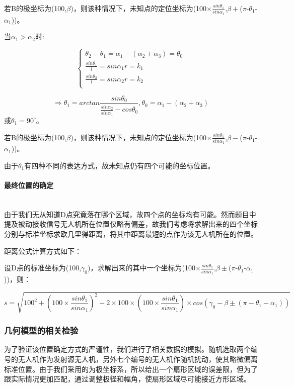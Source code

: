 \documentclass{ctexart}
\newcommand{\subsubsubsection}[1]{\paragraph{#1}\mbox{}\\}
\begin{document}
若B的极坐标为(100,$\beta$)，则该种情况下，未知点的定位坐标为(100$\times\frac{sin\theta_1}{sin\alpha_1}$,$\beta +$($\pi$-$\theta_1$-$\alpha_1$))。


当$\alpha_1 > \alpha_2$时:

\begin{equation}
    \left\{
              \begin{array}{ll}
                \theta_2-\theta_1=\alpha_1-(\alpha_2+\alpha_3)=\theta_0\\
                \frac{sin\theta_1}{l}={sin\alpha_1}{r}=k_1\\
                \frac{sin\theta_2}{l}={sin\alpha_2}{r}=k_2\\

              \end{array}
            \right.
\end{equation}

\[
    \Rightarrow \theta_1=arctan\frac{sin\theta_0}{\frac{sin\alpha_2}{sin\alpha_1}-cos\theta_0},\theta_0=\alpha_1-(\alpha_2+\alpha_3)
\]
或$\theta_1=90^{\circ}$。

若B的极坐标为(100,$\beta$)，则该种情况下，未知点的定位坐标为(100$\times\frac{sin\theta_1}{sin\alpha_1}$,$\beta -$($\pi$-$\theta_1$-$\alpha_1$))。

由于$\theta_1$有四种不同的表达方式，故未知点仍有四个可能的坐标位置。 

\subsubsubsection{最终位置的确定}

由于我们无从知道D点究竟落在哪个区域，故四个点的坐标均有可能。然而题目中提及被动接收信号无人机所在位置仅略有偏差，故我们考虑将求解出来的四个坐标分别与标准坐标求欧几里得距离，将其中距离最短的点作为该无人机所在的位置。

距离公式计算方式如下：

设D点的标准坐标为(100,$\gamma_0$)，求解出来的其中一个坐标为(100$\times\frac{sin\theta_1}{sin\alpha_1}$,$\beta \pm$($\pi$-$\theta_1$-$\alpha_1$))，则：

\[
 s=\sqrt{100^2+(100\times\frac{sin\theta_1}{sin\alpha_1})^2-2\times100\times(100\times\frac{sin\theta_1}{sin\alpha_1})\times cos(\gamma_0-\beta \pm(\pi-\theta_1-\alpha_1))}
\]

\subsubsection{几何模型的相关检验}

为了验证该位置确定方式的严谨性，我们进行了相关数据的模拟。随机选取两个编号的无人机作为发射源无人机，另外七个编号的无人机作随机扰动，使其略微偏离标准位置。由于我们采用的为极坐标系，所以给出一个扇形区域的误差限，但为了跟实际情况更加匹配，通过调整极径和幅角，使扇形区域尽可能接近方形区域。
\end{document}

